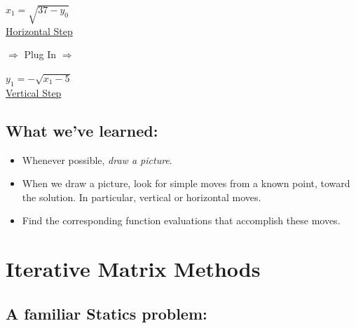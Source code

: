 \documentclass[a4paper,12pt]{report}
\begin{document}
	\bigskip
	
\begin{multicols}{3}
\fbox
{
	\parbox{0.25\textwidth}
	{
	\begin{center}
		$x_1 = \sqrt{37 - y_0}$\\
		\medskip
		\underline{Horizontal Step}
	\end{center}
	}
}
\begin{center}

\bigskip

	\noindent $\Rightarrow$ Plug In $\Rightarrow$
	
\end{center}	
\fbox
{
	\parbox{0.25\textwidth}
	{
	\begin{center}
		$y_1 = - \sqrt{x_1 - 5}$\\
		\medskip
		\underline{Vertical Step}
	\end{center}
	}
}
\end{multicols}


\section{What we've learned:}

\begin{itemize}
\item Whenever possible, \textit{draw a picture}.
\item When we draw a picture, look for simple moves from a known point, toward the solution.  In particular, vertical or horizontal moves.
\item Find the corresponding function evaluations that accomplish these moves.
\end{itemize}


\chapter{Iterative Matrix Methods}
\section{A familiar Statics problem:}	
\end{document}
